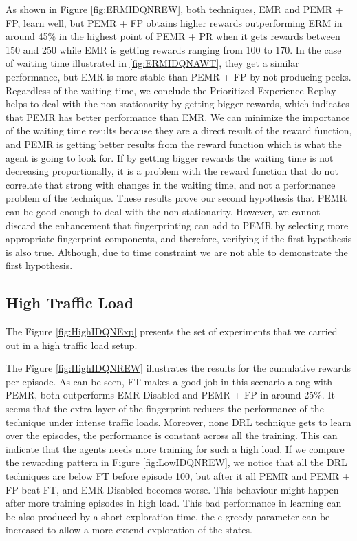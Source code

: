 \documentclass{llncs}
\begin{document}
As shown in Figure \ref{fig:ERMIDQNREW}, both techniques, EMR and PEMR + FP, learn well, but PEMR + FP obtains higher rewards outperforming ERM in around 45$\%$ in the highest point of PEMR + PR when it gets rewards between 150 and 250 while EMR is getting rewards ranging from 100 to 170. In the case of waiting time illustrated in \ref{fig:ERMIDQNAWT}, they get a similar performance, but EMR is  more stable than PEMR + FP by not producing peeks. Regardless of the waiting time, we conclude the Prioritized Experience Replay helps to deal with the non-stationarity by getting bigger rewards, which indicates that PEMR has better performance than EMR. We can minimize the importance of the waiting time results because they are a direct result of the reward function, and PEMR is getting better results from the reward function which is what the agent is going to look for. If by getting bigger rewards the waiting time is not decreasing proportionally, it is a problem with the reward function that do not correlate that strong with changes in the waiting time, and not a performance problem of the technique. These results prove our second hypothesis that PEMR can be good enough to deal with the non-stationarity. However, we cannot discard the enhancement that fingerprinting can add to PEMR by selecting more appropriate fingerprint components, and therefore, verifying if the first hypothesis is also true. Although, due to time constraint we are not able to demonstrate the first hypothesis.

\subsection{High Traffic Load}

The Figure \ref{fig:HighIDQNExp} presents the set of experiments that we carried out in a high traffic load setup.

The Figure \ref{fig:HighIDQNREW} illustrates the results for the cumulative rewards per episode. As can be seen, FT makes a good job in this scenario along with PEMR, both outperforms EMR Disabled and PEMR + FP in around 25$\%$. It seems that the extra layer of the fingerprint reduces the performance of the technique under intense traffic loads. Moreover, none DRL technique gets to learn over the episodes, the performance is constant across all the training. This can indicate that the agents needs more training for such a high load. If we compare the rewarding pattern in Figure \ref{fig:LowIDQNREW}, we notice that all the DRL techniques are below FT before episode 100, but after it all PEMR and PEMR + FP beat FT, and EMR Disabled becomes worse. This behaviour might happen after more training episodes in high load. This bad performance in learning can be also produced by a short exploration time, the e-greedy parameter can be increased to allow a more extend exploration of the states.
\end{document}
